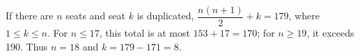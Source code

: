 If there are $n$ seats and seat $k$ is duplicated, $\dfrac{n(n+1)}{2}+k=179$, where $1\le k\le n$. For $n\le17$, this total is at most $153+17=170$; for $n\ge19$, it exceeds 190. Thus $n=18$ and $k=179-171=\boxed8$.

